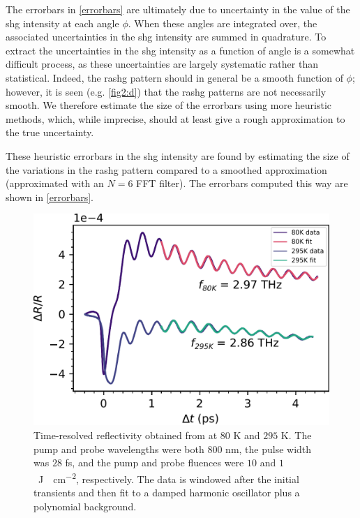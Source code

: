 The errorbars in \cref{errorbars} are ultimately due to uncertainty in the value of the \gls{shg} intensity at each angle $\phi$.
When these angles are integrated over, the associated uncertainties in the \gls{shg} intensity are summed in quadrature.
To extract the uncertainties in the \gls{shg} intensity as a function of angle is a somewhat difficult process, as these uncertainties are largely systematic rather than statistical.
Indeed, the \gls{rashg} pattern should in general be a smooth function of $\phi$; however, it is seen (e.g. \cref{fig2:d}) that the \gls{rashg} patterns are not necessarily smooth.
We therefore estimate the size of the errorbars using more heuristic methods, which, while imprecise, should at least give a rough approximation to the true uncertainty.

These heuristic errorbars in the \gls{shg} intensity are found by estimating the size of the variations in the \gls{rashg} pattern compared to a smoothed approximation (approximated with an $N=6$ FFT filter).
The errorbars computed this way are shown in \cref{errorbars}.

\begin{figure}
\centering
\includegraphics[width=\textwidth]{./gfx/ch6/pp.pdf}
\captionsetup{singlelinecheck=off}
\caption[]{
\label{pp}
Time-resolved reflectivity obtained from \cmb at $80$ \si{K} and $295$ \si{K}.
The pump and probe wavelengths were both $800$ \si{nm}, the pulse width was $28$ \si{fs}, and the pump and probe fluences were $10$ and $1$ \si{\mu J \cdot cm^{-2}}, respectively.
The data is windowed after the initial transients and then fit to a damped harmonic oscillator plus a polynomial background.
}
\end{figure}

